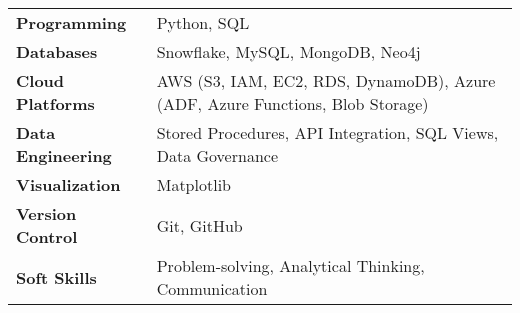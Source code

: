 \documentclass[11pt,a4paper]{article}
\begin{document}
\begin{tabular}{@{}lp{\dimexpr\linewidth-3.5cm}}
\textbf{Programming}       & Python, SQL \\[6pt]
\textbf{Databases}         & Snowflake, MySQL, MongoDB, Neo4j \\[6pt]
\textbf{Cloud Platforms}   & AWS (S3, IAM, EC2, RDS, DynamoDB), Azure (ADF, Azure Functions, Blob Storage) \\[6pt]
\textbf{Data Engineering}  & Stored Procedures, API Integration, SQL Views, Data Governance \\[6pt]
\textbf{Visualization}     & Matplotlib \\[6pt]
\textbf{Version Control}   & Git, GitHub \\[6pt]
\textbf{Soft Skills}       & Problem-solving, Analytical Thinking, Communication
\end{tabular}
\end{document}

